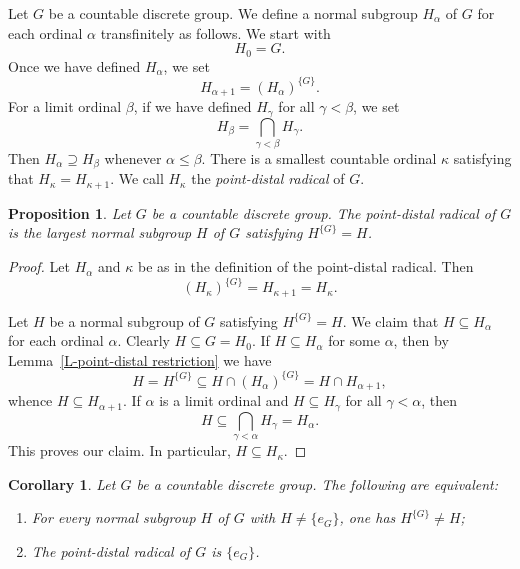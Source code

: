 \documentclass[11pt]{amsart}
\newtheorem{corollary}[theorem]{Corollary}
\newtheorem{proposition}[theorem]{Proposition}
\theoremstyle{definition}
\numberwithin{equation}{section}
\theoremstyle{definition}
\begin{document}
Let $G$ be a countable discrete group. We define a normal subgroup $H_\alpha$ of $G$ for each ordinal $\alpha$ transfinitely as follows. We start with 
$$H_0=G.$$
Once we have defined $H_\alpha$, we set
$$H_{\alpha+1}=(H_\alpha)^{\{G\}}.$$
For a limit ordinal $\beta$, if we have defined $H_\gamma$ for all $\gamma<\beta$, we set
$$H_\beta=\bigcap_{\gamma<\beta}H_\gamma.$$
Then $H_\alpha\supseteq H_\beta$ whenever $\alpha\le \beta$. There is a smallest countable ordinal $\kappa$ satisfying that $H_\kappa=H_{\kappa+1}$. We call $H_\kappa$ the {\it point-distal radical} of $G$. 

\begin{proposition} \label{P-point-distal radical}
Let $G$ be a countable discrete group. The point-distal radical of $G$ is the largest normal subgroup $H$ of $G$ satisfying $H^{\{G\}}=H$. 
\end{proposition}
\begin{proof} Let $H_\alpha$ and $\kappa$ be as in the definition of the point-distal radical. Then 
$$(H_\kappa)^{\{G\}}=H_{\kappa+1}=H_\kappa.$$

Let $H$ be a normal subgroup of $G$ satisfying $H^{\{G\}}=H$. We claim that $H\subseteq H_\alpha$ for each ordinal $\alpha$. Clearly $H\subseteq G=H_0$. If $H\subseteq H_\alpha$ for some $\alpha$, then by Lemma~\ref{L-point-distal restriction} we have
$$ H=H^{\{G\}}\subseteq H\cap (H_\alpha)^{\{G\}}= H\cap H_{\alpha+1},$$
whence $H\subseteq H_{\alpha+1}$. If $\alpha$ is a limit ordinal and $H\subseteq H_\gamma$ for all $\gamma<\alpha$, then
$$ H\subseteq \bigcap_{\gamma<\alpha}H_\gamma= H_\alpha.$$
This proves our claim. In particular, $H\subseteq H_\kappa$. 
\end{proof}


\begin{corollary} \label{C-point-distal radical}
Let $G$ be a countable discrete group. The following are equivalent:
\begin{enumerate}
\item For every normal subgroup $H$ of $G$ with $H\neq \{e_G\}$, one has $H^{\{G\}}\neq H$;
\item The point-distal radical of $G$ is $\{e_G\}$.
\end{enumerate}
\end{corollary}
\end{document}
